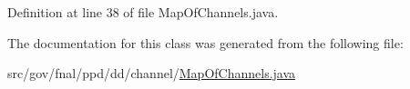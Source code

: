 Definition at line 38 of file Map\-Of\-Channels.\-java.



The documentation for this class was generated from the following file\-:\begin{DoxyCompactItemize}
\item 
src/gov/fnal/ppd/dd/channel/\hyperlink{MapOfChannels_8java}{Map\-Of\-Channels.\-java}\end{DoxyCompactItemize}
